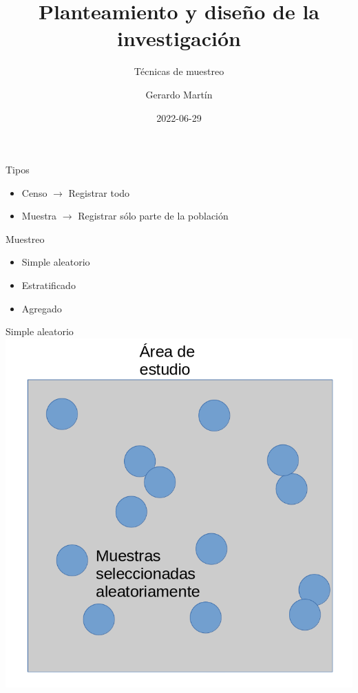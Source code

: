 \documentclass[
  11pt,
  ignorenonframetext,
]{beamer}
\title{Planteamiento y diseño de la investigación}
\subtitle{Técnicas de muestreo}
\author{Gerardo Martín}
\date{2022-06-29}
\begin{document}
\frame{\titlepage}

\begin{frame}{Tipos}
\protect\hypertarget{tipos}{}
\begin{itemize}
\item
  Censo \(\rightarrow\) Registrar todo
\item
  Muestra \(\rightarrow\) Registrar sólo parte de la población
\end{itemize}
\end{frame}

\begin{frame}{Muestreo}
\protect\hypertarget{muestreo}{}
\begin{itemize}
\item
  Simple aleatorio
\item
  Estratificado
\item
  Agregado
\end{itemize}
\end{frame}

\begin{frame}{Simple aleatorio}
\protect\hypertarget{simple-aleatorio}{}
\includegraphics{Figuras-tecnicas/Simple-aleatorio.png}
\end{frame}
\end{document}
